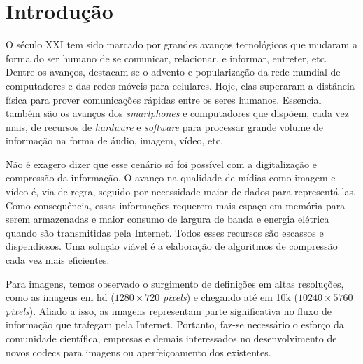 \chapter{Introdução}

O século XXI tem sido marcado por grandes avanços tecnológicos que mudaram a forma do ser humano de se comunicar, relacionar, e informar, entreter, etc. Dentre os avanços, destacam-se o advento e popularização da rede mundial de computadores e das redes móveis para celulares. Hoje, elas superaram a distância física para prover comunicações rápidas entre os seres humanos. Essencial também são os avanços dos \textit{smartphones} e computadores que dispõem, cada vez mais, de recursos de \textit{hardware} e \textit{software} para processar grande volume de informação na forma de áudio, imagem, vídeo, etc.

Não é exagero dizer que esse cenário só foi possível com a digitalização e compressão da informação. O avanço na qualidade de mídias como imagem e vídeo é, via de regra, seguido por necessidade maior de dados para representá-las. Como consequência, essas informações  requerem mais espaço em memória para serem armazenadas e maior consumo de largura de banda e energia elétrica quando são transmitidas pela Internet. Todos esses recursos são escassos e dispendiosos. Uma solução viável é a elaboração de algoritmos de compressão cada vez mais eficientes. 

Para imagens, temos observado o surgimento de definições em altas resoluções, como as imagens em \acrshort{hd} ($1280 \times 720$ \textit{pixels}) e chegando até em 10k ($10240 \times 5760$ \textit{pixels}). Aliado a isso, as imagens representam parte significativa no fluxo de informação que trafegam pela Internet. Portanto, faz-se necessário o esforço da comunidade científica, empresas e demais interessados no desenvolvimento de novos \acrshort{codec}s para imagens ou aperfeiçoamento dos existentes. 




